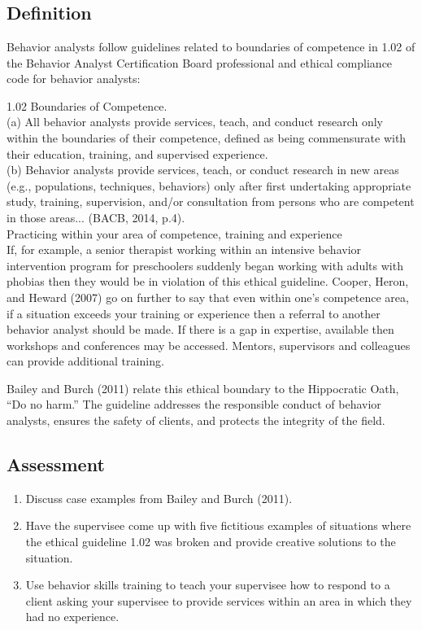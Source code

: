 \clearpage \section[\fourgSeven{}]{\fourgSeven{}%
              }
\subsection{Definition}
Behavior analysts follow guidelines related to boundaries of competence in 1.02 of the Behavior Analyst Certification Board professional and ethical compliance code for behavior analysts:

1.02 Boundaries of Competence.\\
(a) All behavior analysts provide services, teach, and conduct research only within the boundaries of their competence, defined as being commensurate with their education, training, and supervised experience. \\
(b) Behavior analysts provide services, teach, or conduct research in new areas (e.g., populations, techniques, behaviors) only after first undertaking appropriate study, training, supervision, and/or consultation from persons who are competent in those areas... (BACB, 2014, p.4).\\

Practicing within your area of competence, training and experience\\
If, for example, a senior therapist working within an intensive behavior intervention program for preschoolers suddenly began working with adults with phobias then they would be in violation of this ethical guideline. Cooper, Heron, and Heward (2007) go on further to say that even within one's competence area, if a situation exceeds your training or experience then a referral to another behavior analyst should be made. If there is a gap in expertise, available then workshops and conferences may be accessed.  Mentors, supervisors and colleagues can provide additional training.  

Bailey and Burch (2011) relate this ethical boundary to the Hippocratic Oath, ``Do no harm.''  The guideline addresses the responsible conduct of behavior analysts, ensures the safety of clients, and protects the integrity of the field.
%
\subsection{Assessment}
\begin{enumerate}
\item Discuss case examples from Bailey and Burch (2011).
\item Have the supervisee come up with five fictitious examples of situations where the ethical guideline 1.02 was broken and provide creative solutions to the situation.
\item Use behavior skills training to teach your supervisee how to respond to a client asking your supervisee to provide services within an area in which they had no experience.
%
\end{enumerate}
%
